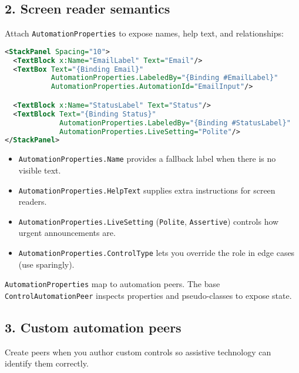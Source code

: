 \subsection{2. Screen reader semantics}\label{screen-reader-semantics}

Attach \passthrough{\lstinline!AutomationProperties!} to expose names,
help text, and relationships:

\begin{lstlisting}[language=XML]
<StackPanel Spacing="10">
  <TextBlock x:Name="EmailLabel" Text="Email"/>
  <TextBox Text="{Binding Email}"
           AutomationProperties.LabeledBy="{Binding #EmailLabel}"
           AutomationProperties.AutomationId="EmailInput"/>

  <TextBlock x:Name="StatusLabel" Text="Status"/>
  <TextBlock Text="{Binding Status}"
             AutomationProperties.LabeledBy="{Binding #StatusLabel}"
             AutomationProperties.LiveSetting="Polite"/>
</StackPanel>
\end{lstlisting}

\begin{itemize}
\tightlist
\item
  \passthrough{\lstinline!AutomationProperties.Name!} provides a
  fallback label when there is no visible text.
\item
  \passthrough{\lstinline!AutomationProperties.HelpText!} supplies extra
  instructions for screen readers.
\item
  \passthrough{\lstinline!AutomationProperties.LiveSetting!}
  (\passthrough{\lstinline!Polite!},
  \passthrough{\lstinline!Assertive!}) controls how urgent announcements
  are.
\item
  \passthrough{\lstinline!AutomationProperties.ControlType!} lets you
  override the role in edge cases (use sparingly).
\end{itemize}

\passthrough{\lstinline!AutomationProperties!} map to automation peers.
The base \passthrough{\lstinline!ControlAutomationPeer!} inspects
properties and pseudo-classes to expose state.

\subsection{3. Custom automation peers}\label{custom-automation-peers}

Create peers when you author custom controls so assistive technology can
identify them correctly.

